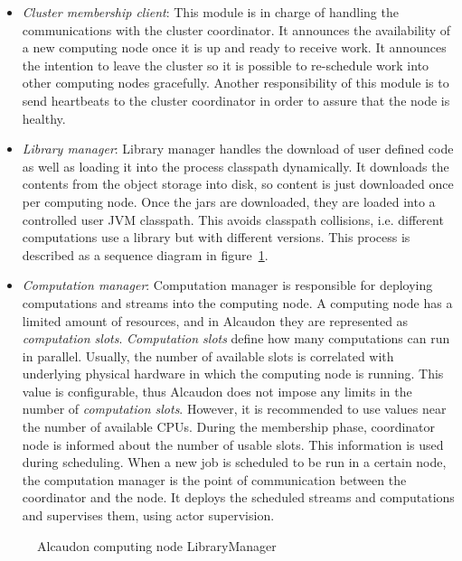 \begin{itemize}
\item \textit{Cluster membership client}: This module is in charge of handling
  the communications with the cluster coordinator. It announces the availability
  of a new computing node once it is up and ready to receive work. It announces
  the intention to leave the cluster so it is possible to re-schedule work into
  other computing nodes gracefully. Another responsibility of this module is to
  send heartbeats to the cluster coordinator in order to assure that the node is
  healthy.
\item \textit{Library manager}: Library manager handles the download of user
  defined code as well as loading it into the process classpath dynamically.
  It downloads the contents from the object storage into disk, so content is
  just downloaded once per computing node. Once the \acs{jar}s are downloaded,
  they are loaded into a controlled user \acs{JVM} classpath. This avoids
  classpath collisions, i.e. different computations use a library but with
  different versions. This process is described as a sequence diagram in
  figure~\ref{fig:librarymanagement}.
\item \textit{Computation manager}: Computation manager is responsible for
  deploying computations and streams into the computing node. A computing node
  has a limited amount of resources, and in Alcaudon they are represented as
  \textit{computation slots}. \textit{Computation slots}
  define how many computations can run in parallel. Usually, the number of
  available slots is correlated with underlying physical hardware in which the
  computing node is running. This value is configurable, thus Alcaudon does not
  impose any limits in the number of \textit{computation slots}. However, it
  is recommended to use values near the number of available CPUs. During
  the membership phase, coordinator node is informed about the number
  of usable slots. This information is used during scheduling. When a new
  job is scheduled to be run in a certain node, the computation manager
  is the point of communication between the coordinator and the node.
  It deploys the scheduled streams and computations and supervises them,
  using actor supervision.
\end{itemize}

\begin{figure}[!h]
  \centering
  \scalebox{0.45}{
    
  }
  \caption{Alcaudon computing node LibraryManager}
  \label{fig:librarymanagement}
\end{figure}

